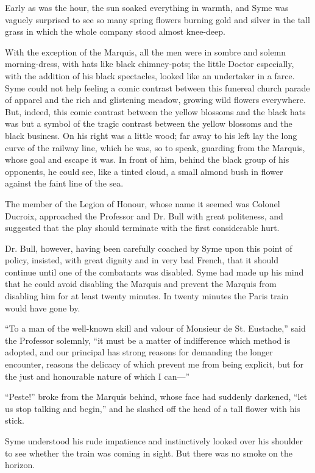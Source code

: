 Early as was the hour, the sun soaked everything in warmth, and Syme was vaguely surprised to see so many spring flowers burning gold and silver in the tall grass in which the whole company stood almost knee-deep.

With the exception of the Marquis, all the men were in sombre and solemn morning-dress, with hats like black chimney-pots; the little Doctor especially, with the addition of his black spectacles, looked like an undertaker in a farce. Syme could not help feeling a comic contrast between this funereal church parade of apparel and the rich and glistening meadow, growing wild flowers everywhere. But, indeed, this comic contrast between the yellow blossoms and the black hats was but a symbol of the tragic contrast between the yellow blossoms and the black business. On his right was a little wood; far away to his left lay the long curve of the railway line, which he was, so to speak, guarding from the Marquis, whose goal and escape it was. In front of him, behind the black group of his opponents, he could see, like a tinted cloud, a small almond bush in flower against the faint line of the sea.

The member of the Legion of Honour, whose name it seemed was Colonel Ducroix, approached the Professor and Dr. Bull with great politeness, and suggested that the play should terminate with the first considerable hurt.

Dr. Bull, however, having been carefully coached by Syme upon this point of policy, insisted, with great dignity and in very bad French, that it should continue until one of the combatants was disabled. Syme had made up his mind that he could avoid disabling the Marquis and prevent the Marquis from disabling him for at least twenty minutes. In twenty minutes the Paris train would have gone by.

“To a man of the well-known skill and valour of Monsieur de St. Eustache,” said the Professor solemnly, “it must be a matter of indifference which method is adopted, and our principal has strong reasons for demanding the longer encounter, reasons the delicacy of which prevent me from being explicit, but for the just and honourable nature of which I can⁠—”

“Peste!” broke from the Marquis behind, whose face had suddenly darkened, “let us stop talking and begin,” and he slashed off the head of a tall flower with his stick.

Syme understood his rude impatience and instinctively looked over his shoulder to see whether the train was coming in sight. But there was no smoke on the horizon.

